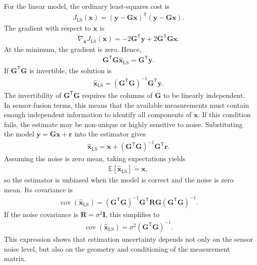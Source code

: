 \documentclass{ieeeaccess}
\begin{document}
For the linear model, the ordinary least-squares cost is
\begin{align}
J_{\mathrm{LS}}(\mathbf{x}) = \left( \mathbf{y} - \mathbf{G}\mathbf{x} \right)^{\mathsf T} \left( \mathbf{y} - \mathbf{G}\mathbf{x} \right).
\end{align}
The gradient with respect to $\mathbf{x}$ is
\begin{align}
\nabla_{\mathbf{x}} J_{\mathrm{LS}}(\mathbf{x}) = -2 \mathbf{G}^{\mathsf T} \mathbf{y} + 2 \mathbf{G}^{\mathsf T} \mathbf{G} \mathbf{x}.
\end{align}
At the minimum, the gradient is zero. Hence,
\begin{align}
\mathbf{G}^{\mathsf T} \mathbf{G} \widehat{\mathbf{x}}_{\mathrm{LS}} = \mathbf{G}^{\mathsf T} \mathbf{y}.
\end{align}
If $\mathbf{G}^{\mathsf T}\mathbf{G}$ is invertible, the solution is
\begin{align}
\widehat{\mathbf{x}}_{\mathrm{LS}} = \left( \mathbf{G}^{\mathsf T} \mathbf{G} \right)^{-1} \mathbf{G}^{\mathsf T} \mathbf{y}.
\end{align}
The invertibility of $\mathbf{G}^{\mathsf T}\mathbf{G}$ requires the columns of $\mathbf{G}$ to be linearly independent. In sensor-fusion terms, this means that the available measurements must contain enough independent information to identify all components of $\mathbf{x}$. If this condition fails, the estimate may be non-unique or highly sensitive to noise.
Substituting the model $\mathbf{y}=\mathbf{G}\mathbf{x}+\mathbf{r}$ into the estimator gives
\begin{align}
\widehat{\mathbf{x}}_{\mathrm{LS}} = \mathbf{x} + \left( \mathbf{G}^{\mathsf T} \mathbf{G} \right)^{-1} \mathbf{G}^{\mathsf T} \mathbf{r}.
\end{align}
Assuming the noise is zero mean, taking expectations yields
\begin{align}
\mathbb{E} \left[ \widehat{\mathbf{x}}_{\mathrm{LS}} \right] = \mathbf{x},
\end{align}
so the estimator is unbiased when the model is correct and the noise is zero mean. Its covariance is
\begin{align}
\operatorname{cov} \left( \widehat{\mathbf{x}}_{\mathrm{LS}} \right) =
\left(
\mathbf{G}^{\mathsf T}
\mathbf{G}
\right)^{-1}
\mathbf{G}^{\mathsf T}
\mathbf{R}
\mathbf{G}
\left(
\mathbf{G}^{\mathsf T}
\mathbf{G}
\right)^{-1}.
\end{align}
If the noise covariance is $\mathbf{R}=\sigma^2\mathbf{I}$, this simplifies to
\begin{align}
\operatorname{cov} \left(\widehat{\mathbf{x}}_{\mathrm{LS}} \right) = \sigma^2\left( \mathbf{G}^{\mathsf T} \mathbf{G} \right)^{-1}.
\end{align}
This expression shows that estimation uncertainty depends not only on the sensor noise level, but also on the geometry and conditioning of the measurement matrix.
\end{document}
